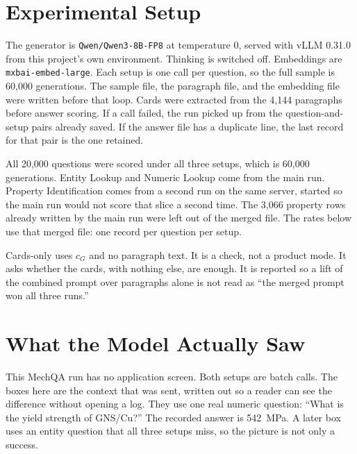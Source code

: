 \documentclass[conference]{IEEEtran}
\begin{document}
\section{Experimental Setup}
The generator is \texttt{Qwen/Qwen3-8B-FP8} at temperature 0, served with vLLM 0.31.0 from this project's own environment. Thinking is switched off. Embeddings are \texttt{mxbai-embed-large}. Each setup is one call per question, so the full sample is 60{,}000 generations. The sample file, the paragraph file, and the embedding file were written before that loop. Cards were extracted from the 4{,}144 paragraphs before answer scoring. If a call failed, the run picked up from the question-and-setup pairs already saved. If the answer file has a duplicate line, the last record for that pair is the one retained.

All 20{,}000 questions were scored under all three setups, which is 60{,}000 generations. Entity Lookup and Numeric Lookup come from the main run. Property Identification comes from a second run on the same server, started so the main run would not score that slice a second time. The 3{,}066 property rows already written by the main run were left out of the merged file. The rates below use that merged file: one record per question per setup.

Cards-only uses \(c_G\) and no paragraph text. It is a check, not a product mode. It asks whether the cards, with nothing else, are enough. It is reported so a lift of the combined prompt over paragraphs alone is not read as ``the merged prompt won all three runs.''

\section{What the Model Actually Saw}
This MechQA run has no application screen. Both setups are batch calls. The boxes here are the context that was sent, written out so a reader can see the difference without opening a log. They use one real numeric question: ``What is the yield strength of GNS/Cu?'' The recorded answer is 542~MPa. A later box uses an entity question that all three setups miss, so the picture is not only a success.
\end{document}
